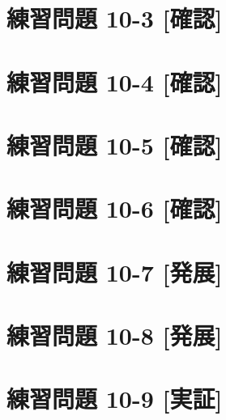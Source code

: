 \documentclass[
]{book}
\begin{document}
\hypertarget{ux7df4ux7fd2ux554fux984c-10-3-ux78baux8a8d}{%
\section*{練習問題 10-3 {[}確認{]}}\label{ux7df4ux7fd2ux554fux984c-10-3-ux78baux8a8d}}

\hypertarget{ux7df4ux7fd2ux554fux984c-10-4-ux78baux8a8d}{%
\section*{練習問題 10-4 {[}確認{]}}\label{ux7df4ux7fd2ux554fux984c-10-4-ux78baux8a8d}}

\hypertarget{ux7df4ux7fd2ux554fux984c-10-5-ux78baux8a8d}{%
\section*{練習問題 10-5 {[}確認{]}}\label{ux7df4ux7fd2ux554fux984c-10-5-ux78baux8a8d}}

\hypertarget{ux7df4ux7fd2ux554fux984c-10-6-ux78baux8a8d}{%
\section*{練習問題 10-6 {[}確認{]}}\label{ux7df4ux7fd2ux554fux984c-10-6-ux78baux8a8d}}

\hypertarget{ux7df4ux7fd2ux554fux984c-10-7-ux767aux5c55}{%
\section*{練習問題 10-7 {[}発展{]}}\label{ux7df4ux7fd2ux554fux984c-10-7-ux767aux5c55}}

\hypertarget{ux7df4ux7fd2ux554fux984c-10-8-ux767aux5c55}{%
\section*{練習問題 10-8 {[}発展{]}}\label{ux7df4ux7fd2ux554fux984c-10-8-ux767aux5c55}}

\hypertarget{ux7df4ux7fd2ux554fux984c-10-9-ux5b9fux8a3c}{%
\section*{練習問題 10-9 {[}実証{]}}\label{ux7df4ux7fd2ux554fux984c-10-9-ux5b9fux8a3c}}
\end{document}
